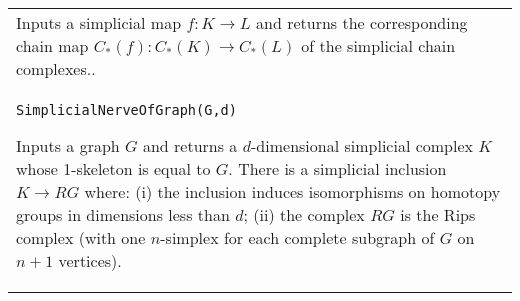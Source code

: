 \documentclass[a4paper,11pt]{report}
\begin{document}
{\begin{center}
\begin{tabular}{|l|}
 Inputs a simplicial map $f\colon K \rightarrow L$ and returns the corresponding chain map $C_\ast(f) \colon C_\ast(K) \rightarrow C_\ast(L)$ of the simplicial chain complexes.. \\
 \index{SimplicialNerveOfGraph} \texttt{SimplicialNerveOfGraph(G,d)} 

 Inputs a graph $G$ and returns a $d$-dimensional simplicial complex $K$ whose 1-skeleton is equal to $G$. There is a simplicial inclusion $K \rightarrow RG$ where: (i) the inclusion induces isomorphisms on homotopy groups in dimensions
less than $d$; (ii) the complex $RG$ is the Rips complex (with one $n$-simplex for each complete subgraph of $G$ on $n+1$ vertices). \\
\end{tabular}\\[2mm]
\end{center}

 }

 
\end{document}
